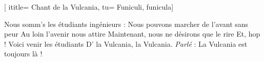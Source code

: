 [
ititle= {Chant de la Vulcania},
tu= {Funiculi, funicula}]


\beginverse
Nous somm's les étudiants ingénieurs :
Nous pouvons marcher de l'avant sans peur
Au loin l'avenir nous attire
Maintenant, nous ne désirons que le rire
Et, hop ! Voici venir les étudiants
D' la Vulcania, la Vulcania.
\textit {Parlé} : La Vulcania est toujours là !
\endverse

\endsong
